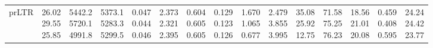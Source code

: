 \begin{landscape}
\begin{table}[t]
{\begin{tabular}{@{}lrrrrrrrrrrrrrr@{}}
prLTR & \makecell[r]{26.02\\29.55\\25.85} & \makecell[r]{5442.2\\5720.1\\4991.8} & \makecell[r]{5373.1\\5283.3\\5299.5} & \makecell[r]{0.047\\0.044\\0.046} & \makecell[r]{2.373\\2.321\\2.395} & \makecell[r]{0.604\\0.605\\0.605} & \makecell[r]{0.129\\0.123\\0.126} & \makecell[r]{1.670\\1.065\\0.677} & \makecell[r]{2.479\\3.855\\3.995} & \makecell[r]{35.08\\25.92\\12.75} & \makecell[r]{71.58\\75.25\\76.23} & \makecell[r]{18.56\\21.01\\20.08} & \makecell[r]{0.459\\0.408\\0.595} & \makecell[r]{24.24\\24.42\\23.77} \\

\end{tabular}}
\end{table}
\end{landscape}

